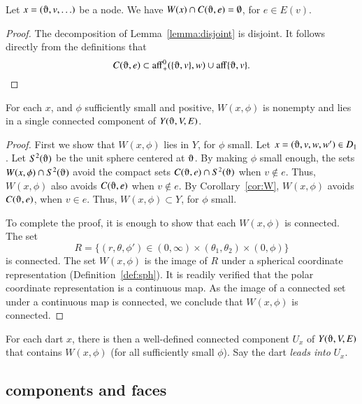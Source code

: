 \begin{corollary}  
Let $x = (\orgn,v,\ldots)$ be a node.
We have $W(x)\cap C(\orgn,e)=\emptyset$, for $e\in E(v)$.
\end{corollary}

\begin{proof} The decomposition of Lemma~\ref{lemma:disjoint} is
disjoint.  It follows directly from the definitions that
   $$C(\orgn,e)\subset \op{aff}_+^0(\{\orgn,v\},w) \cup 
    \op{aff}\{\orgn,v\}.$$
\end{proof}

\begin{lemma} For each $x$, and $\phi$ sufficiently small and positive,
$W(x,\phi)$ is nonempty and lies in a single connected
component of $Y(\orgn,V,E)$.
\end{lemma}

\begin{proof}  First we show that $W(x,\phi)$ lies in $Y$,
for $\phi$ small.  Let $x=(\orgn,v,w,w')\in D_1$.  
Let $S^2(\orgn)$ be the unit sphere centered at $\orgn$.
By making $\phi$ small enough,
the sets $W(x,\phi)\cap S^2(\orgn)$
avoid the compact sets $C(\orgn,e)\cap S^2(\orgn)$ when $v\not\in e$.
Thus, $W(x,\phi)$ also avoids $C(\orgn,e)$ when $v\not\in e$.
By Corollary~\ref{cor:W}, $W(x,\phi)$ avoids $C(\orgn,e)$, when $v\in e$.
Thus, $W(x,\phi)\subset Y$, for $\phi$ small.

To complete the proof, it is enough to show that each $W(x,\phi)$ is
connected.  
The  set
   $$
   R=\{(r,\theta,\phi') \in (0,\infty) \times (\theta_1,\theta_2) \times (0,\phi)\}
   $$
is connected.
The set $W(x,\phi)$  is the image of $R$
under a spherical coordinate representation (Definition~\ref{def:sph}).
It is readily verified that the polar coordinate representation is
a continuous map. As the image of a connected set under a continuous map
is connected, we conclude that $W(x,\phi)$ is connected.
\end{proof}

\begin{definition} For each dart $x$, 
there is then a well-defined connected
component $U_x$ of $Y(\orgn,V,E)$ 
that contains $W(x,\phi)$ (for all
sufficiently small $\phi$). Say the dart {\it leads into}
$U_x$.
\end{definition}


\subsection{components and faces}


